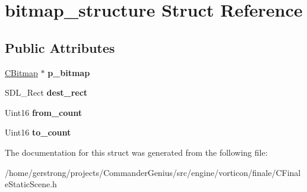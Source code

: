 \hypertarget{structbitmap__structure}{
\section{bitmap\_\-structure Struct Reference}
\label{structbitmap__structure}
}
\subsection*{Public Attributes}
\begin{DoxyCompactItemize}
\item 
\hypertarget{structbitmap__structure_a10298a463d5ffa4661e80429fbcccb8f}{
\hyperlink{class_c_bitmap}{CBitmap} $\ast$ {\bfseries p\_\-bitmap}}
\label{structbitmap__structure_a10298a463d5ffa4661e80429fbcccb8f}

\item 
\hypertarget{structbitmap__structure_aa7814531224341b9f3f84cd2cf477189}{
SDL\_\-Rect {\bfseries dest\_\-rect}}
\label{structbitmap__structure_aa7814531224341b9f3f84cd2cf477189}

\item 
\hypertarget{structbitmap__structure_afe7c4d7d53d3574dee1ce4a81b7d5454}{
Uint16 {\bfseries from\_\-count}}
\label{structbitmap__structure_afe7c4d7d53d3574dee1ce4a81b7d5454}

\item 
\hypertarget{structbitmap__structure_a11ee805f5a394fcba312a0c1e0318230}{
Uint16 {\bfseries to\_\-count}}
\label{structbitmap__structure_a11ee805f5a394fcba312a0c1e0318230}

\end{DoxyCompactItemize}


The documentation for this struct was generated from the following file:\begin{DoxyCompactItemize}
\item 
/home/gerstrong/projects/CommanderGenius/src/engine/vorticon/finale/CFinaleStaticScene.h\end{DoxyCompactItemize}

